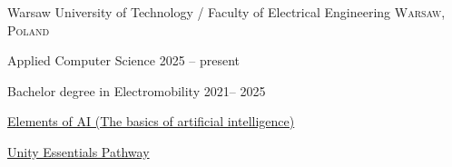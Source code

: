 \documentclass[10pt,a4paper]{article} %
\begin{document}



\spacedhrule{-0.2em}{-0.4em} %



\headedsection %
{Warsaw University of Technology / Faculty of Electrical Engineering}
{\textsc{Warsaw, Poland}} {

\headedsubsection %
{Applied Computer Science}
{2025 -- present}
{}


\headedsubsection %
{Bachelor degree in Electromobility}
{2021-- 2025}
{}
}

\spacedhrule{0.5em}{-0.4em} %


\headedsubsection %
{\href{https://certificates.mooc.fi/validate/1maqk140qk4L}
{Elements of AI (The basics of artificial intelligence)}}
{}

\headedsubsection %
{\href{https://www.credly.com/badges/af3440ab-a859-4927-a4ad-5df752dd7c4a/public_url}
{Unity Essentials Pathway}}
{}
\end{document}
